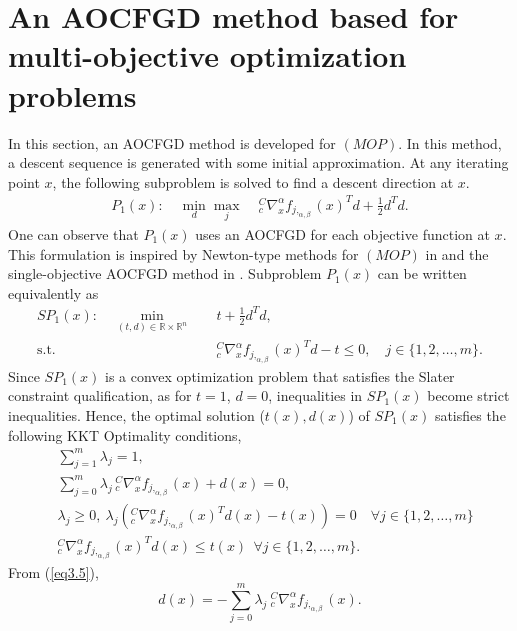 \documentclass[smallextended,referee,envcountsect]{svjour3}
\begin{document}
\section{An AOCFGD method based for multi-objective optimization problems}\label{sec3}
In this section, an AOCFGD method is developed for $(MOP)$. In this method, a descent sequence is generated with some initial approximation. At any iterating point $x$, the following subproblem is solved to find a descent direction at $x$.
\begin{equation*}\label{eq3.1}
\begin{aligned}
P_1(x): \quad 
\min_{d} \max_{j} \; & {}^C_c\nabla^{\alpha}_x f_{j,_{\alpha,\beta}}(x)^Td
+ \frac{1}{2} d^T d.
\end{aligned}
\end{equation*}
One can observe that $P_1(x)$ uses an AOCFGD for each objective function at $x$.  This formulation is inspired by Newton-type methods for $(MOP)$ in \cite{3} and the single-objective AOCFGD method in \cite{72}. Subproblem $P_1(x)$ can be written equivalently as
 \begin{equation*}\label{eq3.4}
\begin{aligned}
SP_1(x):\quad\min_{(t,d)\in\mathbb{R}\times \mathbb{R}^n} \quad &  t + \frac{1}{2} d^T d, \\
\text{s.t.} \quad &{}^C_c\nabla^{\alpha}_x f_{j,_{\alpha,\beta}}(x)^T d - t \leq 0,  \quad j \in \{1, 2, \dots, m\} .
\end{aligned}
\end{equation*}
Since $SP_1(x)$ is a convex optimization problem that satisfies the Slater constraint qualification, as for $t=1$, $d=0$, inequalities in $SP_1(x)$ become strict inequalities. Hence, the optimal solution ($t(x),d(x)$) of $SP_1(x)$ satisfies the following KKT Optimality conditions,
\begin{align}
&\sum_{j=1}^m \lambda_j = 1,\label{kkt1}\\
&\sum_{j=0}^m \lambda_j \, {}^C_c\nabla^{\alpha}_x f_{j,_{\alpha,\beta}}(x) + d(x) = 0, \label{eq3.5} \\
&\lambda_j \geq 0, ~\lambda_j \left( {}^C_c\nabla^{\alpha}_x f_{j,_{\alpha,\beta}}(x)^T d(x) - t(x) \right) = 0 \quad \forall j \in \{1, 2, \dots, m\} \label{kkt3}\\
& {}^C_c\nabla^{\alpha}_x f_{j,_{\alpha,\beta}}(x)^T d(x) \leq t(x)~~\forall j \in \{1, 2, \dots, m\}. \label{feas_kkt}
\end{align}
From (\ref{eq3.5}),
\begin{equation}\label{d}
d(x) = -\sum_{j=0}^m \lambda_j
~{}^C_c\nabla^{\alpha}_x f_{j,_{\alpha,\beta}}(x).
\end{equation}
\end{document}
